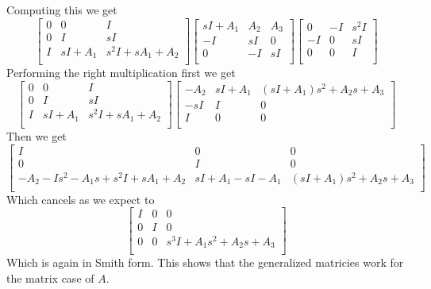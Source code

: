 \documentclass{article}
\begin{document}
Computing this we get
$$
\begin{bmatrix}
0 & 0 & I \\
0 & I & sI \\
I & sI+A_1 & s^2I+sA_1 + A_2 \\
\end{bmatrix}
\begin{bmatrix}
sI+A_1 & A_2 & A_3 \\
  -I &   sI &    0 \\
   0 &   -I &   sI \\
\end{bmatrix}
\begin{bmatrix}
0 & -I & s^2I \\
-I & 0 & sI \\
0 & 0 & I \\
\end{bmatrix}
$$
Performing the right multiplication first we get
$$
\begin{bmatrix}
0 & 0 & I \\
0 & I & sI \\
I & sI+A_1 & s^2I+sA_1 + A_2 \\
\end{bmatrix}
\begin{bmatrix}
-A_2 & sI+A_1 & (sI+A_1) s^2 +A_2s + A_3 \\
-sI &      I & 0 \\
  I &      0 & 0 \\
\end{bmatrix}
$$
Then we get
$$
\begin{bmatrix}
I & 0 & 0 \\
0 & I & 0 \\
-A_2 -Is^2-A_1s + s^2I +sA_1+A_2 & sI+A_1 - sI - A_1 & (sI+A_1) s^2 +A_2s + A_3 \\
\end{bmatrix}
$$
Which cancels as we expect to
$$
\begin{bmatrix}
I & 0 & 0 \\
0 & I & 0 \\
0 & 0 & s^3I+ A_1s^2 + A_2s + A_3 \\
\end{bmatrix}
$$
Which is again in Smith form.
This shows that the generalized matricies work for the matrix case of $A$.
\end{document}
